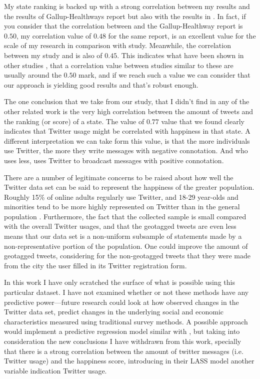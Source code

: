 \documentclass{llncs}
\begin{document}
My state ranking is backed up with a strong correlation between my results and the results of Gallup-Healthways report but also with the results in \cite{Mitchell2013}. In fact, if you consider that the correlation between \cite{Mitchell2013} and the Gallup-Healthway report is $0.50$, my correlation value of $0.48$ for the same report, is an excellent value for the scale of my research in comparison with \cite{Mitchell2013} study. Meanwhile, the correlation between my study and \cite{Mitchell2013} is also of $0.45$. This indicates what have been shown in other studies \cite{Dodds2011}, that a correlation value between studies similar to these are usually around the $0.50$ mark, and if we reach such a value we can consider that our approach is yielding good results and that's robust enough.

The one conclusion that we take from our study, that I didn't find in any of the other related work is the very high correlation between the amount of tweets and the ranking (or score) of a state. The value of $0.77$ value that we found clearly indicates that Twitter usage might be correlated with happiness in that state. A different interpretation we can take form this value, is that the more individuals use Twitter, the more they write messages with negative connotation. And who uses less, uses Twitter to broadcast messages with positive connotation.

There are a number of legitimate concerns to be raised about how well the Twitter data set can be said to represent the happiness of the greater population. Roughly 15\% of online adults regularly use Twitter, and 18-29 year-olds and minorities tend to be more highly represented on Twitter than in the general population \cite{Smith2012}. Furthermore, the fact that the collected sample is small compared with the overall Twitter usages, and that the geotagged tweets are even less means that our data set is a non-uniform subsample of statements made by a non-representative portion of the population. One could improve the amount of geotagged tweets, considering for the non-geotagged tweets that they were made from the city the user filled in its Twitter registration form.

In this work I have only scratched the surface of what is possible using this particular dataset. I have not examined whether or not these methods have any predictive power—future research could look at how observed changes in the Twitter data set, predict changes in the underlying social and economic characteristics measured using traditional survey methods. A possible approach would implement a predictive regression model similar with \cite{Schwartz2013}, but taking into consideration the new conclusions I have withdrawn from this work, specially that there is a strong correlation between the amount of twitter messages (i.e. Twitter usage) and the happiness score, introducing in their LASS model another variable indication Twitter usage.



\end{document}
